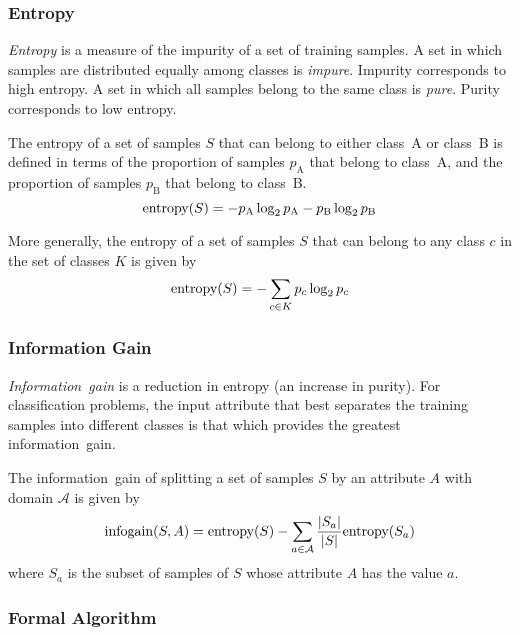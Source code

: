 \subsubsection{Entropy}

\emph{Entropy} is a measure of the impurity of a set of training samples.
A set in which samples are distributed equally among classes is \emph{impure}.
Impurity corresponds to high entropy.
A set in which all samples belong to the same class is \emph{pure}.
Purity corresponds to low entropy.

The entropy of a set of samples \( S \) that can belong to either class~A or class~B is defined in terms of the proportion of samples \( p_{\mathrm{A}} \) that belong to class~A, and the proportion of samples \( p_{\mathrm{B}} \) that belong to class~B.
\begin{equation*}
  \mathrm{\text{entropy}}\!\left( S \right) = - p_{\mathrm{A}} \log_{2} p_{\mathrm{A}} - p_{\mathrm{B}} \log_{2} p_{\mathrm{B}}
\end{equation*}

More generally, the entropy of a set of samples \( S \) that can belong to any class \( c \) in the set of classes \( K \) is given by
\begin{equation*}
  \mathrm{\text{entropy}}\!\left( S \right) = - \sum_{c \in K} p_{c} \log_{2} p_{c}
\end{equation*}

\subsubsection{Information Gain}

\emph{Information~gain} is a reduction in entropy (an increase in purity).
For classification problems, the input attribute that best separates the training samples into different classes is that which provides the greatest information~gain.

The information~gain of splitting a set of samples \( S \) by an attribute \( A \) with domain \( \mathcal{A} \) is given by
\begin{equation*}
  \mathrm{\text{infogain}}\!\left( S, A \right) = \mathrm{\text{entropy}}\!\left( S \right) - \sum_{a \in \mathcal{A}} \frac{\left\lvert S_{a} \right\rvert}{\left\lvert S \right\rvert} \mathrm{\text{entropy}}\!\left( S_{a} \right)
\end{equation*}
where \( S_{a} \) is the subset of samples of \( S \) whose attribute \( A \) has the value \( a \).

\subsubsection{Formal Algorithm}

